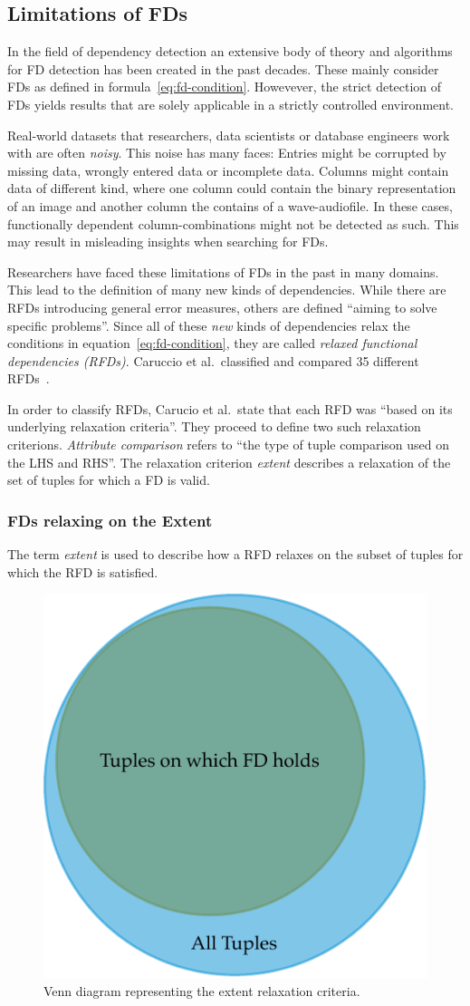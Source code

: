 \subsection{Limitations of FDs}
In the field of dependency detection an extensive body of theory and algorithms for FD detection has been created in the past decades.\cite[p.~1]{PAP15}
These mainly consider FDs as defined in formula~\ref{eq:fd-condition}.
Howevever, the strict detection of FDs yields results that are solely applicable in a strictly controlled environment.

Real-world datasets that researchers, data scientists or database engineers work with are often \emph{noisy}.
This noise has many faces:
Entries might be corrupted by missing data, wrongly entered data or incomplete data.
Columns might contain data of different kind, where one column could contain the binary representation of an image and another column the contains of a wave-audiofile.
In these cases, functionally dependent column-combinations might not be detected as such.
This may result in misleading insights when searching for FDs.

Researchers have faced these limitations of FDs in the past in many domains.
This lead to the definition of many new kinds of dependencies.
While there are RFDs introducing general error measures, others are defined ``aiming to solve specific problems''\cite[p.~147]{CAR16}.
Since all of these \emph{new} kinds of dependencies relax the conditions in equation~\ref{eq:fd-condition}, they are called \emph{relaxed functional dependencies (RFDs)}.
Caruccio et al.\ classified and compared 35 different RFDs~\cite[p.~151]{CAR16}.

In order to classify RFDs, Carucio et al.\ state that each RFD was ``based on its underlying relaxation criteria''\cite[p.~149]{CAR16}.
They proceed to define two such relaxation criterions.
\emph{Attribute comparison} refers to ``the type of tuple comparison used on the LHS and RHS''.
The relaxation criterion \emph{extent} describes a relaxation of the set of tuples for which a FD is valid.

\subsubsection{FDs relaxing on the Extent}
The term \emph{extent} is used to describe how a RFD relaxes on the subset of tuples for which the RFD is satisfied.

\begin{figure}[ht]
     \centering
     \includegraphics[width=.4\textwidth]{images/rfds-extent.pdf}
     \caption{Venn diagram representing the extent relaxation criteria.}
     \label{fig:rfds-extent}
 \end{figure}

